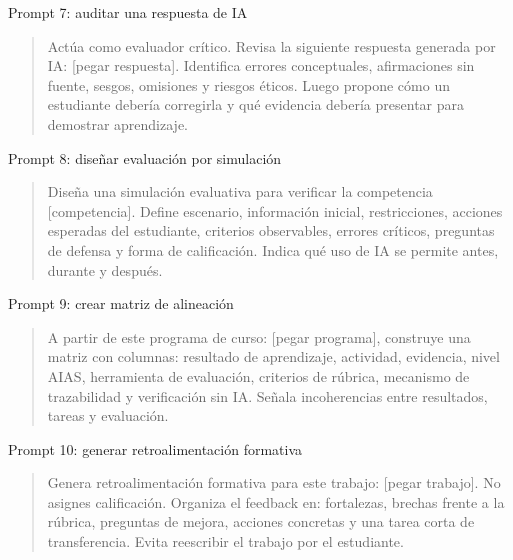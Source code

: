 \documentclass[
  ignorenonframetext,
  aspectratio=169,
  spanish,
]{beamer}
\begin{document}
\begin{frame}{Prompt 7: auditar una respuesta de IA}
\protect{}\label{prompt-7-auditar-una-respuesta-de-ia}
\begin{quote}
Actúa como evaluador crítico. Revisa la siguiente respuesta generada por
IA: {[}pegar respuesta{]}. Identifica errores conceptuales, afirmaciones
sin fuente, sesgos, omisiones y riesgos éticos. Luego propone cómo un
estudiante debería corregirla y qué evidencia debería presentar para
demostrar aprendizaje.
\end{quote}
\end{frame}

\begin{frame}{Prompt 8: diseñar evaluación por simulación}
\protect{}\label{prompt-8-diseuxf1ar-evaluaciuxf3n-por-simulaciuxf3n}
\begin{quote}
Diseña una simulación evaluativa para verificar la competencia
{[}competencia{]}. Define escenario, información inicial, restricciones,
acciones esperadas del estudiante, criterios observables, errores
críticos, preguntas de defensa y forma de calificación. Indica qué uso
de IA se permite antes, durante y después.
\end{quote}
\end{frame}

\begin{frame}{Prompt 9: crear matriz de alineación}
\protect{}\label{prompt-9-crear-matriz-de-alineaciuxf3n}
\begin{quote}
A partir de este programa de curso: {[}pegar programa{]}, construye una
matriz con columnas: resultado de aprendizaje, actividad, evidencia,
nivel AIAS, herramienta de evaluación, criterios de rúbrica, mecanismo
de trazabilidad y verificación sin IA. Señala incoherencias entre
resultados, tareas y evaluación.
\end{quote}
\end{frame}

\begin{frame}{Prompt 10: generar retroalimentación formativa}
\protect{}\label{prompt-10-generar-retroalimentaciuxf3n-formativa}
\begin{quote}
Genera retroalimentación formativa para este trabajo: {[}pegar
trabajo{]}. No asignes calificación. Organiza el feedback en:
fortalezas, brechas frente a la rúbrica, preguntas de mejora, acciones
concretas y una tarea corta de transferencia. Evita reescribir el
trabajo por el estudiante.
\end{quote}
\end{frame}
\end{document}

